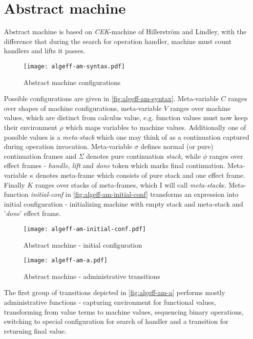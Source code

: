 \documentclass[inz, english, shortabstract]{iithesis}
\begin{document}
\section{Abstract machine}
Abstract machine is based on \emph{CEK}-machine of Hillerström and Lindley\cite{Hillerstrom2016}, with the difference that during the search for operation handler, machine must count handlers and lifts it passes.

\begin{figure}
  \centering
  \texttt{[image: algeff-am-syntax.pdf]}
  \caption{Abstract machine configurations}
  \label{fig:algeff-am-syntax}
\end{figure}

Possible configurations are given in \autoref{fig:algeff-am-syntax}.
Meta-variable $ C $ ranges over shapes of machine configurations, meta-variable $ V $ ranges over machine values, which are distinct from calculus value, e.g. function values must now keep their environment $ \rho $ which maps variables to machine values.
Additionally one of possible values is a \emph{meta-stack} which one may think of as a continuation captured during operation invocation.
Meta-variable $ \sigma $ defines normal (or pure) continuation frames and $ \Sigma $ denotes pure continuation \emph{stack}, while $ \phi $ ranges over effect frames - \emph{handle}, \emph{lift} and \emph{done} token which marks final continuation.
Meta-variable $ \kappa $ denotes meta-frame which consists of pure stack and one effect frame.
Finally $ K $ ranges over stacks of meta-frames, which I will call \emph{meta-stack}s.
Meta-function \emph{initial-conf} in \autoref{fig:algeff-am-initial-conf} transforms an expression into initial configuration - initializing machine with empty stack and meta-stack and '\emph{done}' effect frame.

\begin{figure}
  \centering
  \texttt{[image: algeff-am-initial-conf.pdf]}
  \caption{Abstract machine - initial configuration}
  \label{fig:algeff-am-initial-conf}
\end{figure}

\begin{figure}[h]
  \centering
  \texttt{[image: algeff-am-a.pdf]} 
  \caption{Abstract machine - administrative transitions}
  \label{fig:algeff-am-a}
\end{figure}

The first group of transitions depicted in \autoref{fig:algeff-am-a} performs mostly administrative functions - capturing environment for functional values, transforming from value terms to machine values, sequencing binary operations, switching to special configuration for search of handler and a transition for returning final value.
\end{document}

